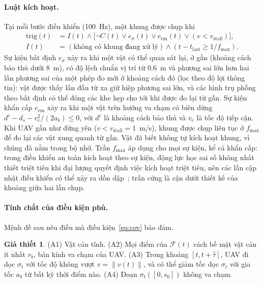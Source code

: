 \documentclass[11pt,a4paper]{article}
\theoremstyle{plain}
\theoremstyle{definition}
\newtheorem{assumption}{Giả thiết}
\theoremstyle{remark}
\newcommand{\fmax}{f_{\max}}
\newcommand{\tauh}{\hat{\tau}}
\newcommand{\Fs}{\mathcal{F}}
\begin{document}
\paragraph{Luật kích hoạt.} Tại mỗi bước điều khiển (100~Hz), một khung được chụp khi
\begin{equation}\label{eq:trig}
\begin{aligned}
\mathrm{trig}(t) &= I(t) \wedge \big[\neg C(t) \vee e_\sigma(t) \vee e_{\mathrm{em}}(t) \vee (v < v_{\mathrm{stall}})\big],\\
I(t) &= (\text{không có khung đang xử lý}) \wedge (t - t_{\mathrm{last}} \ge 1/\fmax).
\end{aligned}
\end{equation}
Sự kiện bất định $e_\sigma$ xảy ra khi một vật có thể quan sát lại, ở gần (khoảng cách bảo thủ dưới 8~m), có độ lệch chuẩn vị trí từ 0.6~m và phương sai lớn hơn hai lần phương sai của một phép đo mới ở khoảng cách đó (lọc theo độ lợi thông tin): vật được thấy lần đầu từ xa giữ hiệp phương sai lớn, và các hình trụ phồng theo bất định có thể đóng các khe hẹp cho tới khi được đo lại từ gần. Sự kiện khẩn cấp $e_{\mathrm{em}}$ xảy ra khi một vật trên hướng va chạm có biên dừng $d^c - d_s - v_c^2/(2a_b) \le 0$, với $d^c$ là khoảng cách bảo thủ và $v_c$ là tốc độ tiếp cận. Khi UAV gần như đứng yên ($v < v_{\mathrm{stall}} = 1$~m/s), khung được chụp liên tục ở $\fmax$ để đo lại các vật xung quanh từ gần. Vật đã biết không tự kích hoạt khung, vì chúng đã nằm trong bộ nhớ. Trần $\fmax$ áp dụng cho mọi sự kiện, kể cả khẩn cấp: trong điều khiển an toàn kích hoạt theo sự kiện, động lực học sai số không nhất thiết triệt tiêu khi đại lượng quyết định việc kích hoạt triệt tiêu, nên các lần cập nhật điều khiển có thể xảy ra dồn dập~\cite{taylor2020}; trần cứng là cận dưới thiết kế của khoảng giữa hai lần chụp.

\paragraph{Tính chất của điều kiện phủ.} Mệnh đề sau nêu điều mà điều kiện~\eqref{eq:cov} bảo đảm.

\begin{assumption}\label{as:cov}
(A1) Vật cản tĩnh. (A2) Mọi điểm của $\Fs(t)$ cách bề mặt vật cản ít nhất $r_b$, bán kính va chạm của UAV. (A3) Trong khoảng $[t, t+\tauh]$, UAV đi dọc $\sigma_t$ với tốc độ không vượt $v = \|v(t)\|$, và có thể giảm tốc dọc $\sigma_t$ với gia tốc $a_b$ từ bất kỳ thời điểm nào. (A4) Đoạn $\sigma_t([0,s_0])$ không va chạm.
\end{assumption}
\end{document}
